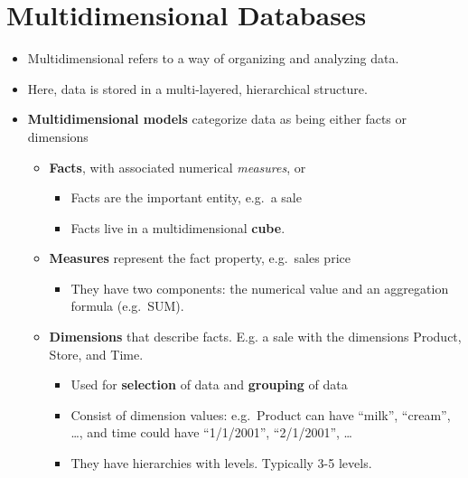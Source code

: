 

\section{Multidimensional Databases}
\begin{multicols}{2}
\begin{itemize}
\item
  Multidimensional refers to a way of organizing and analyzing data.
\item
  Here, data is stored in a multi-layered, hierarchical structure.
\item
  \textbf{Multidimensional models} categorize data as being either facts
  or dimensions

  \begin{itemize}
    \item
    \textbf{Facts}, with associated numerical \emph{measures}, or

    \begin{itemize}
        \item
      Facts are the important entity, e.g.~a sale
    \item
      Facts live in a multidimensional \textbf{cube}.
    \end{itemize}
  \item
    \textbf{Measures} represent the fact property, e.g.~sales price

    \begin{itemize}
        \item
      They have two components: the numerical value and an aggregation
      formula (e.g.~SUM).
    \end{itemize}
  \item
    \textbf{Dimensions} that describe facts. E.g. a sale with the
    dimensions Product, Store, and Time.

    \begin{itemize}
        \item
      Used for \textbf{selection} of data and \textbf{grouping} of data
    \item
      Consist of dimension values: e.g.~Product can have ``milk'',
      ``cream'', \ldots, and time could have ``1/1/2001'', ``2/1/2001'',
      \ldots{}
    \item
      They have hierarchies with levels. Typically 3-5 levels.


\end{itemize}
\end{itemize}
\end{itemize}
\end{multicols}

